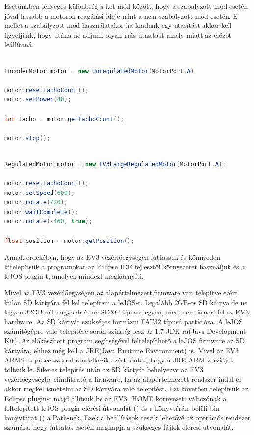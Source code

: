 Esetünkben lényeges különbség a két mód között, hogy a szabályzott mód esetén jóval lassabb a motorok reagálási ideje mint a nem szabályzott mód esetén. E mellet a szabályzott mód használatakor ha kiadunk egy utasítást akkor kell figyeljünk, hogy utána ne adjunk olyan más utasítást amely miatt az előzőt leállítaná.

\begin{lstlisting}[label=motorUnregMod, caption=  A nagy motor \texttt{regulated} mód használata, language=Java]

EncoderMotor motor = new UnregulatedMotor(MotorPort.A)

motor.resetTachoCount();
motor.setPower(40);

int tacho = motor.getTachoCount();

motor.stop();

\end{lstlisting}

\begin{lstlisting}[label=motorRegMod, caption= A nagy motor \texttt{unregulated} mód használata, language=Java]

RegulatedMotor motor = new EV3LargeRegulatedMotor(MotorPort.A);

motor.resetTachoCount();
motor.setSpeed(600);
motor.rotate(720);
motor.waitComplete();
motor.rotate(-460, true);

float position = motor.getPosition();

\end{lstlisting}

Annak érdekében, hogy az EV3 vezérlőegységen futtassuk és könnyedén kitelepítsük a programokat az Eclipse IDE fejlesztői környezetet használjuk és a leJOS plugin-t, amelyek mindezt megkönnyíti.

Mivel az EV3 vezérlőegységen az alapértelmezett firmware van telepítve ezért külön SD kártyára fel kel telepíteni a leJOS-t. Legalább 2GB-os SD kártya de ne legyen 32GB-nál nagyobb és ne SDXC típusú legyen, mert nem ismeri fel az EV3 hardware. Az SD kártyát szükséges formázni FAT32 típusú partícióra. A leJOS számítógépre való telepítése során szükség lesz az 1.7 JDK-ra(Java Development Kit). Az előkészített program segítségével feltelepíthető a leJOS firmware az SD kártyára, ehhez még kell a JRE(Java Runtime Environment) is. Mivel az EV3 ARM9-es processzorral rendelkezik ezért fontos, hogy a JRE ARM verzióját töltsük le. Sikeres telepítés után az SD kártyát behelyezve az EV3 vezérlőegységbe elindítható a firmware, ha az alapértelmezett rendszer indul el akkor megkel ismételni az SD kártyára való telepítést. Ezt követően telepítsük az Eclipse plugin-t majd állítsuk be az EV3\_HOME környezeti változónak a feltelepített leJOS plugin elérési útvonalát () és a könyvtárán belüli bin könyvtárat () a Path-nek. Ezek a beállítások teszik lehetővé az operációs rendszer számára, hogy futtatás esetén megkapja a szükséges fájlok elérési útvonalát.

